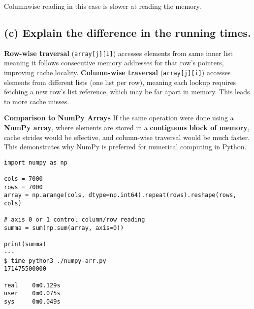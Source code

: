 \documentclass{article}
\begin{document}
Columnwise reading in this case is slower at reading the memory.

\subsection*{(c) Explain the difference in the running times.}
\textbf{Row-wise traversal} (\texttt{array[j][i]}) accesses elements from 
same inner list meaning it follows consecutive memory addresses for that row's pointers,
improving cache locality.
\textbf{Column-wise traversal} (\texttt{array[j][i]}) accesses elements from different
lists (one list per row), meaning each lookup requires fetching a new row's list
reference, which may be far apart in memory. This leads to more cache misses.

\bigskip

{\scriptsize
\textbf{Comparison to NumPy Arrays}
If the same operation were done using a \textbf{NumPy array}, where elements are stored in a \textbf{contiguous block of memory}, cache strides would be effective, and column-wise traversal would be much faster. This demonstrates why NumPy is preferred for numerical computing in Python.
\begin{verbatim}
import numpy as np

cols = 7000
rows = 7000
array = np.arange(cols, dtype=np.int64).repeat(rows).reshape(rows, cols)

# axis 0 or 1 control column/row reading
summa = sum(np.sum(array, axis=0))

print(summa)
---
$ time python3 ./numpy-arr.py 
171475500000

real    0m0.129s
user    0m0.075s
sys     0m0.049s
\end{verbatim}
}
\end{document}
